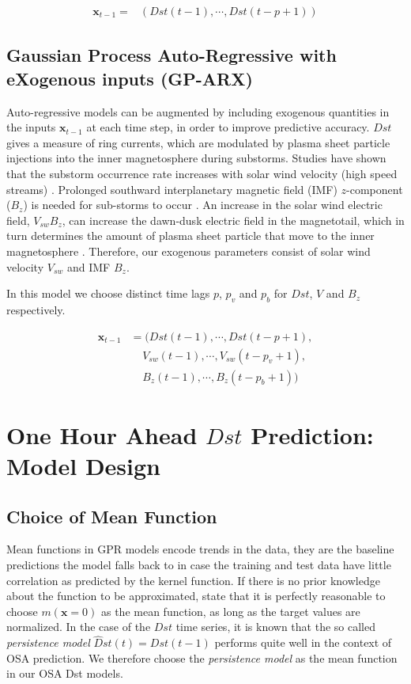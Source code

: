 \documentclass{article}
\begin{document}
\begin{align*}
  \mathbf{x}_{t-1} = & \left(Dst(t-1), \cdots , Dst(t-p+1)\right)
\end{align*}

\subsection{Gaussian Process Auto-Regressive with eXogenous inputs (GP-ARX)} \label{sec:gparx}

Auto-regressive models can be augmented by including exogenous quantities in the inputs $\mathbf{x}_{t-1}$ at each time step, in order to improve predictive accuracy. $Dst$ gives a measure of ring currents, which are modulated by plasma sheet particle injections into the inner magnetosphere during substorms. Studies have shown that the substorm occurrence rate increases with solar wind velocity (high speed streams) \citet{Kissinger2011,Newell2016}. Prolonged southward interplanetary magnetic field (IMF) $z$-component ($B_z$) is needed for sub-storms to occur \citet{McPherron1986}. An increase in the solar wind electric field, $V_{sw}B_z$, can increase the dawn-dusk electric field in the magnetotail, which in turn determines the amount of plasma sheet particle that move to the inner magnetosphere \citet{Friedel2001}. Therefore, our exogenous parameters consist of solar wind velocity $V_{sw}$ and IMF $B_z$.   

In this model we choose distinct time lags $p$, $p_{v}$ and $p_{b}$ for $Dst$, $V$ and $B_z$ respectively.

\begin{align*}
  \mathbf{x}_{t-1} & = (Dst(t-1), \cdots , Dst(t-p+1), \\
                   & \ \ \ \ \  V_{sw}(t-1), \cdots, V_{sw}(t-p_{v}+1),\\
                   & \ \ \ \ \  B_{z}(t-1), \cdots, B_{z}(t-p_{b}+1))
\end{align*}

\section{One Hour Ahead $Dst$ Prediction: Model Design}\label{sec:modeldesign}

\subsection{Choice of Mean Function}

Mean functions in GPR models encode trends in the data, they are the baseline predictions the model falls back to in case the training and test data have little correlation as predicted by the kernel function. If there is no prior knowledge about the function to be approximated, \citet{Rasmussen:2005:GPM:1162254} state that it is perfectly reasonable to choose $m(\mathbf{x} = 0)$ as the mean function, as long as the target values are normalized. In the case of the $Dst$ time series, it is known that the so called \emph{persistence model} $\hat{D}st(t) = Dst(t-1)$ performs quite well in the context of OSA prediction. We therefore choose the \emph{persistence model} as the mean function in our OSA Dst models.
\end{document}
